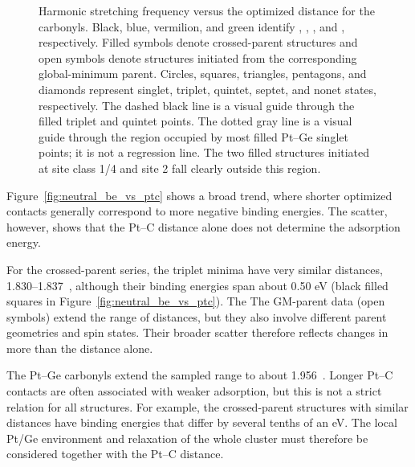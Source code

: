 \begin{figure}[H]
\centering

\caption{Harmonic  stretching frequency versus the optimized
 distance for the carbonyls. Black, blue, vermilion, and green identify
, , , and , respectively.
Filled symbols denote crossed-parent structures and open symbols denote
structures initiated from the corresponding global-minimum parent. Circles,
squares, triangles, pentagons, and diamonds represent singlet, triplet,
quintet, septet, and nonet states, respectively. The dashed black line is a
visual guide through the filled  triplet and quintet points. The
dotted gray line is a visual guide through the region occupied by most filled
Pt--Ge singlet points; it is not a regression line. The two filled
 structures initiated at site class 1/4 and site 2 fall clearly outside this
region.}
\label{fig:neutral_co_frequency}
\end{figure}

Figure~\ref{fig:neutral_be_vs_ptc} shows a broad trend, where shorter optimized
 contacts generally correspond to more negative  binding
energies. The scatter, however, shows that the Pt--C distance alone does not
determine the adsorption energy.

For the crossed-parent 
series, the triplet minima have very similar  distances,
1.830--1.837~\si{\angstromunit}, although their binding energies span about 0.50 eV (black
filled squares in
Figure~\ref{fig:neutral_be_vs_ptc}). The
 The GM-parent data (open symbols) extend the
range of  distances, but they also involve different parent geometries
and spin states. Their broader scatter therefore reflects changes in more than
the  distance alone.

The Pt--Ge carbonyls extend the sampled  range to about
1.956~\si{\angstromunit}. Longer Pt--C contacts are often associated with weaker adsorption,
but this is not a strict relation for all structures. For example, the
 crossed-parent structures with similar  distances have
binding energies that differ by several tenths of an eV. The local Pt/Ge
environment and relaxation of the whole cluster must therefore be considered
together with the Pt--C distance.

